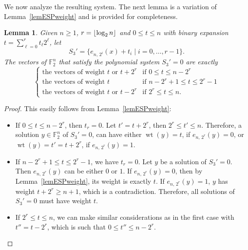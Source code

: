\documentclass[11pt]{article}
\newcommand{\F}[0]{\mathbb{F}}
\newcommand{\es}[2]{e_{#1,\, #2}}
\DeclarePairedDelimiter{\fl}{\lfloor}{\rfloor}
\theoremstyle{plain}
\newtheorem{lem}[theo]{Lemma}
\theoremstyle{definition}
\theoremstyle{remark}
\begin{document}
We now analyze the resulting system. 
The next lemma is a variation of Lemma~\ref{lemESPweight} and is provided for completeness.
\begin{lem}\label{lemNSESDP}
    Given $n\geq1$, $r=\fl*{\operatorname{log}_2 n}$ and $0\leq t\leq n$ with binary expansion $t = \sum\limits_{\ell=0}^r t_\ell2^\ell$, let
    \[
        S_3'=\{\es{n}{2^i}(x)+t_i\mid i=0,\dots,r-1\}.
    \]
    The vectors of $\F_2^n$ that satisfy the polynomial system $S_3'=0$ are exactly
    \begin{equation*}
        \begin{cases}
            \text{the vectors of weight }t\text{ or }t+2^r&\text{if }0\leq t\leq n-2^r\\
            \text{the vectors of weight }t&\text{if }n-2^r+1\leq t\leq 2^r-1\\
            \text{the vectors of weight }t\text{ or }t-2^r&\text{if }2^r\leq t\leq n.
        \end{cases}
    \end{equation*}    
\end{lem}
\begin{proof}
    This easily follows from Lemma~\ref{lemESPweight}:
    \begin{itemize}
        \item If $0\leq t\leq n-2^r$, then $t_r=0$. Let $t'=t+2^r$, then $2^r\leq t'\leq n$. Therefore, a solution $y\in\F_2^n$ of $S_3'=0$, can have either $\operatorname{wt}(y)=t$, if $\es{n}{2^r}(y)=0$, or $\operatorname{wt}(y)=t'=t+2^r$, if $\es{n}{2^r}(y)=1$.
        \item If $n-2^r+1\leq t\leq 2^r-1$, we have $t_r=0$. Let $y$ be a solution of $S_3'=0$. Then $\es{n}{2^r}(y)$ can be either $0$ or $1$. If $\es{n}{2^r}(y)=0$, then by Lemma~\ref{lemESPweight}, its weight is exactly $t$. If $\es{n}{2^r}(y)=1$, $y$ has weight $t+2^r\geq n+1$, which is a contradiction. Therefore, all solutions of $S_3'=0$ must have weight $t$.
        \item If $2^r\leq t\leq n$, we can make similar considerations as in the first case with $t''=t-2^r$, which is such that $0\leq t''\leq n-2^r$.
    \end{itemize}
\end{proof}

\end{document}
